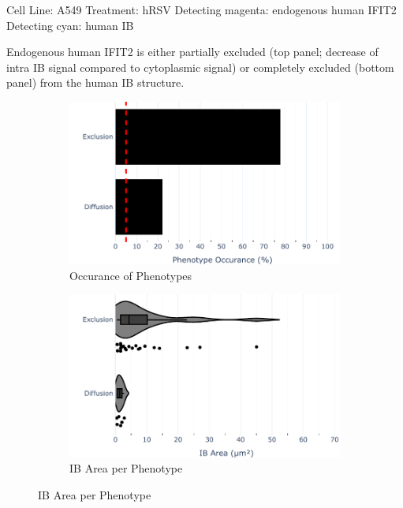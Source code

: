 Cell Line: A549 \newline
Treatment: hRSV \newline
Detecting magenta: endogenous human IFIT2  \newline
Detecting cyan: human IB \newline

Endogenous human IFIT2 is either partially excluded (top panel; decrease of intra IB signal compared to cytoplasmic signal) or completely excluded (bottom panel) from the human IB structure.

\begin{figure}
    \begin{subfigure}{0.5\textwidth}
        \includegraphics[width=1\linewidth]{10. Chapter 5/Figs/01. Infection/02. IFIT2B/04. bar_i2b_a549-p.pdf} 
        \caption[]{Occurance of Phenotypes}
    \end{subfigure}
    \begin{subfigure}{0.5\textwidth}
        \includegraphics[width=1\linewidth]{10. Chapter 5/Figs/01. Infection/02. IFIT2B/05. violin_i2b_a549-p.pdf}
        \caption[]{IB Area per Phenotype}
    \end{subfigure}


\end{figure}
